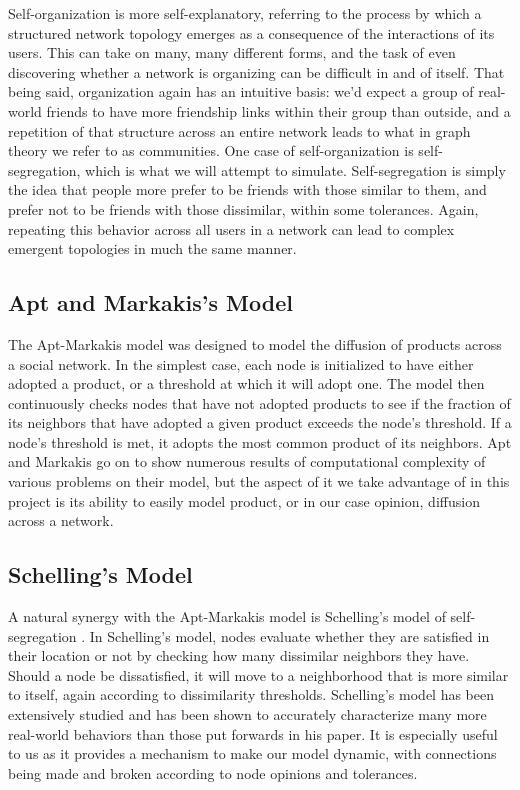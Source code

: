 \documentclass[12pt,twoside]{report}
\begin{document}
Self-organization is more self-explanatory, referring to the process by which a structured network topology emerges as a consequence of the interactions of its users. This can take on many, many different forms, and the task of even discovering whether a network is organizing can be difficult in and of itself. That being said, organization again has an intuitive basis: we'd expect a group of real-world friends to have more friendship links within their group than outside, and a repetition of that structure across an entire network leads to what in graph theory we refer to as communities. One case of self-organization is self-segregation, which is what we will attempt to simulate. Self-segregation is simply the idea that people more prefer to be friends with those similar to them, and prefer not to be friends with those dissimilar, within some tolerances. Again, repeating this behavior across all users in a network can lead to complex emergent topologies in much the same manner. \\

\subsection{Apt and Markakis's Model}

The Apt-Markakis model \cite{apt2011diffusion} was designed to model the diffusion of products across a social network. In the simplest case, each node is initialized to have either adopted a product, or a threshold at which it will adopt one. The model then continuously checks nodes that have not adopted products to see if the fraction of its neighbors that have adopted a given product exceeds the node's threshold. If a node's threshold is met, it adopts the most common product of its neighbors. Apt and Markakis go on to show numerous results of computational complexity of various problems on their model, but the aspect of it we take advantage of in this project is its ability to easily model product, or in our case opinion, diffusion across a network. \\

\subsection{Schelling's Model}

A natural synergy with the Apt-Markakis model is Schelling's model of self-segregation \cite{schelling1971dynamic}. In Schelling's model, nodes evaluate whether they are satisfied in their location or not by checking how many dissimilar neighbors they have. Should a node be dissatisfied, it will move to a neighborhood that is more similar to itself, again according to dissimilarity thresholds. Schelling's model has been extensively studied and has been shown to accurately characterize many more real-world behaviors than those put forwards in his paper. It is especially useful to us as it provides a mechanism to make our model dynamic, with connections being made and broken according to node opinions and tolerances. \\
\end{document}
